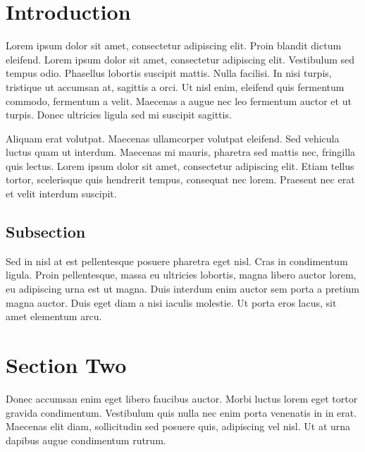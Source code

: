 \documentclass{carver-cyberlaw}
\begin{document}
\section{Introduction}

Lorem ipsum dolor sit amet, consectetur adipiscing elit. Proin blandit dictum eleifend. Lorem ipsum dolor sit amet, consectetur adipiscing elit. Vestibulum sed tempus odio. Phasellus lobortis suscipit mattis. Nulla facilisi. In nisi turpis, tristique ut accumsan at, sagittis a orci. Ut nisl enim, eleifend quis fermentum commodo, fermentum a velit. Maecenas a augue nec leo fermentum auctor et ut turpis. Donec ultricies ligula sed mi suscipit sagittis.

Aliquam erat volutpat. Maecenas ullamcorper volutpat eleifend. Sed vehicula luctus quam ut interdum. Maecenas mi mauris, pharetra sed mattis nec, fringilla quis lectus. Lorem ipsum dolor sit amet, consectetur adipiscing elit. Etiam tellus tortor, scelerisque quis hendrerit tempus, consequat nec lorem. Praesent nec erat et velit interdum suscipit.

\subsection{Subsection}

Sed in nisl at est pellentesque posuere pharetra eget nisl. Cras in condimentum ligula. Proin pellentesque, massa eu ultricies lobortis, magna libero auctor lorem, eu adipiscing urna est ut magna. Duis interdum enim auctor sem porta a pretium magna auctor. Duis eget diam a nisi iaculis molestie. Ut porta eros lacus, sit amet elementum arcu.

\section{Section Two}

Donec accumsan enim eget libero faucibus auctor. Morbi luctus lorem eget tortor gravida condimentum. Vestibulum quis nulla nec enim porta venenatis in in erat. Maecenas elit diam, sollicitudin sed posuere quis, adipiscing vel nisl. Ut at urna dapibus augue condimentum rutrum.
\end{document}
